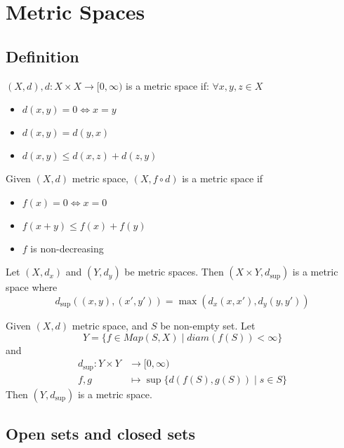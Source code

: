 \chapter{Metric Spaces}
\section{Definition}
\begin{definition}
  $(X, d), d: X \times X \to [0, \infty)$ is a metric space if: $\forall x,y,z \in X$
  \begin{itemize}
    \item $d(x,y) = 0 \iff x = y$
    \item $d(x,y) = d(y,x)$
    \item $d(x,y) \leq d(x,z) + d(z,y)$
  \end{itemize}
\end{definition}

\begin{theorem}
  Given $(X, d)$ metric space, $(X, f \circ d)$ is a metric space if
  \begin{itemize}
    \item $f(x) = 0 \iff x = 0$
    \item $f(x+y) \leq f(x) + f(y)$
    \item $f$ is non-decreasing
  \end{itemize}
\end{theorem}

\begin{theorem}
  Let $(X, d_x)$ and $(Y, d_y)$ be metric spaces.
  Then $(X \times Y, d_{\sup})$ is a metric space where
  \[d_{\sup}((x, y), (x', y')) = \max(d_x(x, x'), d_y(y, y'))\]
\end{theorem}

\begin{theorem}
  Given $(X, d)$ metric space, and $S$ be non-empty set. Let
  \[Y = \{f \in Map(S, X) \mid diam(f(S)) < \infty \}\]
  and 
  \begin{align*}
    d_{\sup}: Y \times Y &\to [0, \infty)\\
    f, g&\mapsto \sup\{d(f(S), g(S)) \mid s \in S\}
  \end{align*}
  Then $(Y, d_{\sup})$ is a metric space.
\end{theorem}

\section{Open sets and closed sets}
